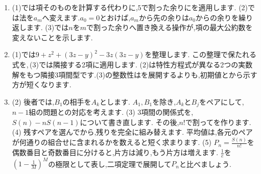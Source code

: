 \begin{enumerate}[label=\textbf{問\arabic*.},leftmargin=3.8em,format=\bookitemlink{practice-entrance}{hint}{answer}]
    個数を数える際には,最初の2枚のどちらに$1$または$2$があるかで4つに分けます.
    $1$を取り除く場合と$2$を取り除く場合は,小さい配置との対応が異なることに注意します.
  \item (1)では項そのものを計算する代わりに,$5$で割った余りにを適用します.
    (2)では法を$a_m$へ変えます.$a_0=0$とおけば,$a_m$から先の余りは$a_0$からの余りを繰り返します.
    (3)では$n$を$m$で割った余りへ置き換える操作が,項の最大公約数を変えないことを示します.
  \item (1)では$9+z^2+(3z-y)^2-3z(3z-y)$を整理します.
    この整理で保たれる式を,\,(3)では隣接する2項に適用します.
    (2)は特性方程式が異なる2つの実数解をもつ隣接3項間型です.(3)の整数性はを展開するよりも,初期値とから示す方が短くなります.
  \item (2) 後者では,$B_1$の相手を$A_k$とします.
    $A_1,B_1$を除き,$A_k$と$B_j$をペアにして,$n-1$組の問題との対応を考えます.
    (3) 3項間の関係式を,$S(n)-nS(n-1)$について書き直します.
    その後,$n!$で割ってを作ります.
    (4) 残すペアを選んでから,残りを完全に組み替えます.
    平均値は,各元のペアが何通りの組合せに含まれるかを数えると短く求まります.
    (5) $P_n=\frac{S(n)}{n!}$を偶数番目と奇数番目に分けると,片方は減り,もう片方は増えます.
    $\frac1e$を$\left(1-\frac1M\right)^M$の極限として表し,二項定理で展開して$P_n$と比べましょう.
\end{enumerate}

